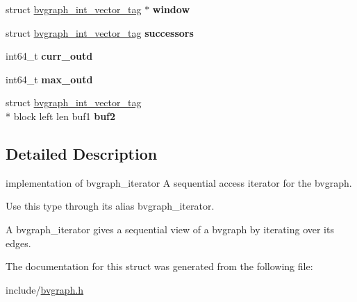 \begin{DoxyCompactItemize}
\item 
\hypertarget{structbvgraph__iterator__tag_a0c64f4d495d333e99f285ce6f46a8089}{struct \hyperlink{structbvgraph__int__vector__tag}{bvgraph\+\_\+int\+\_\+vector\+\_\+tag} $\ast$ {\bfseries window}}\label{structbvgraph__iterator__tag_a0c64f4d495d333e99f285ce6f46a8089}

\item 
\hypertarget{structbvgraph__iterator__tag_a6394a756cdced409531f850fbc14aa00}{struct \hyperlink{structbvgraph__int__vector__tag}{bvgraph\+\_\+int\+\_\+vector\+\_\+tag} {\bfseries successors}}\label{structbvgraph__iterator__tag_a6394a756cdced409531f850fbc14aa00}

\item 
\hypertarget{structbvgraph__iterator__tag_a9898b2466767b2df77075d92c8a7503f}{int64\+\_\+t {\bfseries curr\+\_\+outd}}\label{structbvgraph__iterator__tag_a9898b2466767b2df77075d92c8a7503f}

\item 
\hypertarget{structbvgraph__iterator__tag_ab8759b1155669af46aac3b355fc46c04}{int64\+\_\+t {\bfseries max\+\_\+outd}}\label{structbvgraph__iterator__tag_ab8759b1155669af46aac3b355fc46c04}

\item 
\hypertarget{structbvgraph__iterator__tag_a2b66f5ccfbb98b8a11629eba917d6245}{struct \hyperlink{structbvgraph__int__vector__tag}{bvgraph\+\_\+int\+\_\+vector\+\_\+tag} \\*
block left len buf1 {\bfseries buf2}}\label{structbvgraph__iterator__tag_a2b66f5ccfbb98b8a11629eba917d6245}

\end{DoxyCompactItemize}


\subsection{Detailed Description}
implementation of bvgraph\+\_\+iterator A sequential access iterator for the bvgraph. 

Use this type through its alias bvgraph\+\_\+iterator.

A bvgraph\+\_\+iterator gives a sequential view of a bvgraph by iterating over its edges. 

The documentation for this struct was generated from the following file\+:\begin{DoxyCompactItemize}
\item 
include/\hyperlink{bvgraph_8h}{bvgraph.\+h}\end{DoxyCompactItemize}
